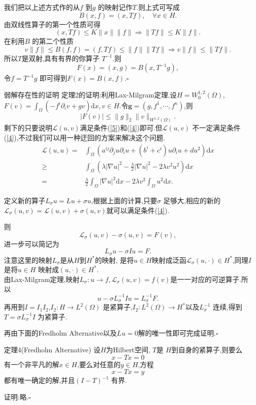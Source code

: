 \begin{frame}[t]
  我们把以上述方式作的从$f$ 到$g$ 的映射记作$T$.则上式可写成
   \[
     B(x,f)=(x,Tf),\quad \forall x\in H.
  \] 
由双线性算子的第一个性质可得
\[
  (x,Tf)\le K\|x\|\|f\|
\Rightarrow \|Tf\|\le K\|f\|.
\] 
在利用$B$ 的第二个性质
\[
  v\|f\|\le B(f,f)=(f,Tf)\le \|f\|\|Tf\|\Rightarrow v\|f\|\le \|Tf\|.
\] 
所以$T$是双射,具有有界的你算子 $T^{-1}$.则
\[
  F(x)=(x,g)=B(x,T^{-1}g),
\] 
令$f=T^{-1}g$ 即可得到$F(x)=B(x,f)$.\hfill $\square$ \par
\end{frame}
\begin{frame}[t]{弱解存在性的证明}
  定理2的证明:利用Lax-Milgram定理,设$H=W^{1,2}_0(\Omega)$, $F(v)=\int_{\Omega}(-f^{i}\partial_i v+gv)\mathrm{d}x,v\in H$.令$\mathbf{g}=(g,f^{1},\cdots,f^{n})$,则
  \[
    |F(v)|\le \|g\|_2 \|v\|_{W^{1,2}(\Omega)}.
  \] 
  剩下的只要说明$\mathcal{L}(u,v)$满足条件(\ref{5})和(\ref{4})即可.但$\mathcal{L}(u,v)$ 不一定满足条件(\ref{4}),不过我们可以用一种迂回的方案来解决这个问题.
\begin{align*}
  \mathcal{L}(u,u)= & \int_{\Omega}\left( a^{ij}\partial_j u\partial_i u+(b^{i}+c^{i})u\partial_i u  +du^2  \right) \mathrm{d}x\\
  \ge & \int_{\Omega}\left( \lambda|\nabla u|^2- \frac{\lambda}{2}|\nabla u|^2-2\lambda v^2u^2 \right) \mathrm{d}x\\
  = & \frac{\lambda}{2}\int_{\Omega}|\nabla u|^2\mathrm{d}x-2\lambda v^2\int_{\Omega}u^2\mathrm{d}x 
.\end{align*}
\end{frame}
\begin{frame}[t]
  定义新的算子$L_\sigma u = L u +\sigma u$,根据上面的计算,只要$\sigma$ 足够大,相应的新的$\mathcal{L}_\sigma(u,v)=\mathcal{L}(u,v)+\sigma(u,v)$就可以满足条件(\ref{4}).

  则
   \[
     \mathcal{L}_\sigma (u,v)-\sigma(u,v)=F(v),
  \]
  进一步可以简记为
  \[
  L_\sigma u -\sigma I u = F.
  \] 
  注意这里的映射$L_\sigma$是从$H$到$H^*$的映射, 是将$u\in H$映射成泛函$\mathcal{L}_\sigma(u,\cdot )\in H^*$,同理$I$ 是将$u\in H$ 映射成$( u,\cdot )\in H^*$.\\
  由Lax-Milgram定理,映射$L_\sigma :u\to f,\mathcal{L}_\sigma(u,v)=f(v)$是一一对应的可逆算子.所以
  \[
  u-\sigma L_\sigma^{-1}I u = L^{-1}_\sigma F.
  \] 
  再用到$I=I_1I_2$,$I_2:H\to L^{2}(\Omega)$ 是紧算子,$I_2: L^{2}(\Omega)\to H^{*}$以及$L^{-1}_\sigma$ 连续,得到$T=\sigma L^{-1}_\sigma I$ 为紧算子.
\end{frame}
\begin{frame}[t]
  再由下面的Fredholm Alternative以及$Lu=0$解的唯一性即可完成证明.\hfill $\square$ \par
  \begin{alertblock}{定理4(Fredholm Alternative)}
    设$H$为Hilbert空间, $T$是 $H$到自身的紧算子,则要么
    \[
    x-Tx=0
    \] 
    有一个非平凡的解$x\in H$,要么对任意的$y\in H$,方程
    \[
    x-Tx=y
    \] 
    都有唯一确定的解,并且$(I-T)^{-1}$ 有界.
  \end{alertblock}
  证明:略.\hfill $\square$\par
\end{frame}
